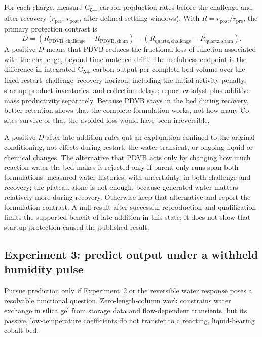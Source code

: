 For each charge, measure C\textsubscript{5+} carbon-production rates before the challenge and after recovery ($r_{\mathrm{pre}}$, $r_{\mathrm{post}}$, after defined settling windows). With $R=r_{\mathrm{post}}/r_{\mathrm{pre}}$, the primary protection contrast is
\begin{equation}
 D=(R_{\mathrm{PDVB,challenge}}-R_{\mathrm{PDVB,sham}})
  -(R_{\mathrm{quartz,challenge}}-R_{\mathrm{quartz,sham}}).
 \label{eq:water-interaction}
\end{equation}
A positive $D$ means that PDVB reduces the fractional loss of function associated with the challenge, beyond time-matched drift. The usefulness endpoint is the difference in integrated C\textsubscript{5+} carbon output per complete bed volume over the fixed restart--challenge--recovery horizon, including the initial activity penalty, startup product inventories, and collection delays; report catalyst-plus-additive mass productivity separately. Because PDVB stays in the bed during recovery, better retention shows that the complete formulation works, not how many Co sites survive or that the avoided loss would have been irreversible.

A positive $D$ after late addition rules out an explanation confined to the original conditioning, not effects during restart, the water transient, or ongoing liquid or chemical changes. The alternative that PDVB acts only by changing how much reaction water the bed makes is rejected only if parent-only runs span both formulations' measured water histories, with uncertainty, in both challenge and recovery; the plateau alone is not enough, because generated water matters relatively more during recovery. Otherwise keep that alternative and report the formulation contrast. A null result after successful reproduction and qualification limits the supported benefit of late addition in this state; it does not show that startup protection caused the published result.

\subsection{Experiment 3: predict output under a withheld humidity pulse}

Pursue prediction only if Experiment~2 or the reversible water response poses a resolvable functional question. Zero-length-column work constrains water exchange in silica gel from storage data and flow-dependent transients, but its passive, low-temperature coefficients do not transfer to a reacting, liquid-bearing cobalt bed.\cite{brandani2022}

